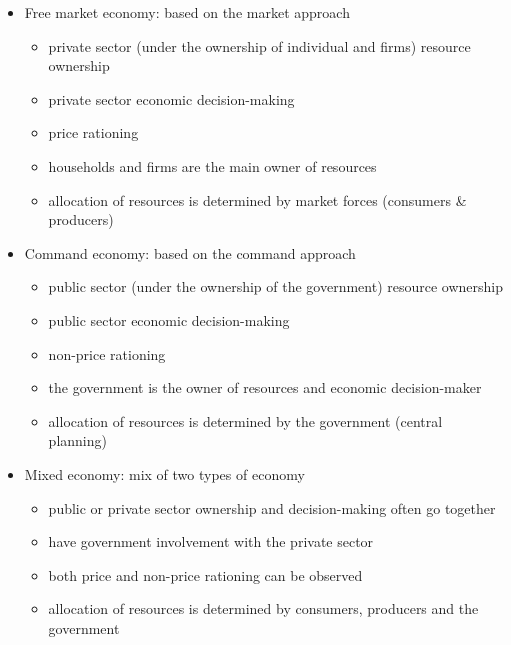 \documentclass[a4paper,12pt]{article}
\begin{document}
\begin{itemize}
  \item Free market economy: based on the market approach
  \begin{itemize}
    \item private sector (under the ownership of individual and firms) resource ownership
    \item private sector economic decision-making
    \item price rationing
    \item households and firms are the main owner of resources
    \item allocation of resources is determined by market forces (consumers \& producers)
  \end{itemize}
  \item Command economy: based on the command approach
  \begin{itemize}
    \item public sector (under the ownership of the government) resource ownership
    \item public sector economic decision-making
    \item non-price rationing
    \item the government is the owner of resources and economic decision-maker
    \item allocation of resources is determined by the government (central planning)
  \end{itemize}
  \item Mixed economy: mix of two types of economy
  \begin{itemize}
    \item public or private sector ownership and decision-making often go together
    \item have government involvement with the private sector
    \item both price and non-price rationing can be observed
    \item allocation of resources is determined by consumers, producers and the government
  \end{itemize}
\end{itemize}
\end{document}
